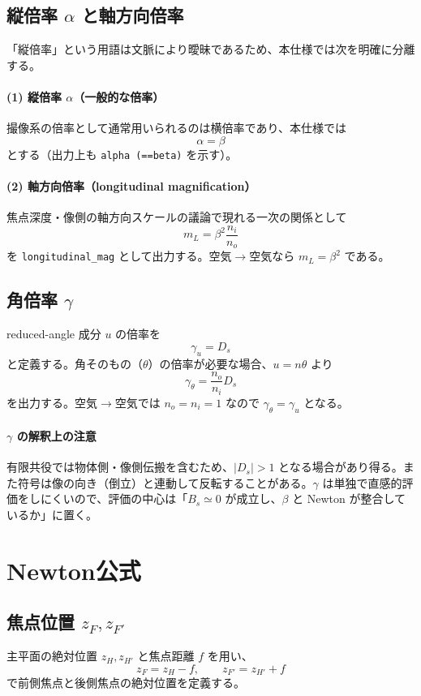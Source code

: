 \subsection{縦倍率 $\alpha$ と軸方向倍率}
「縦倍率」という用語は文脈により曖昧であるため、本仕様では次を明確に分離する。

\paragraph{(1) 縦倍率 $\alpha$（一般的な倍率）}
撮像系の倍率として通常用いられるのは横倍率であり、本仕様では
\[
\boxed{\alpha = \beta}
\]
とする（出力上も \texttt{alpha (==beta)} を示す）。

\paragraph{(2) 軸方向倍率（longitudinal magnification）}
焦点深度・像側の軸方向スケールの議論で現れる一次の関係として
\[
\boxed{
m_L = \beta^2\frac{n_i}{n_o}
}
\]
を \texttt{longitudinal\_mag} として出力する。空気$\to$空気なら $m_L=\beta^2$ である。

\subsection{角倍率 $\gamma$}
reduced-angle 成分 $u$ の倍率を
\[
\boxed{\gamma_u = D_s}
\]
と定義する。角そのもの（$\theta$）の倍率が必要な場合、$u=n\theta$ より
\[
\boxed{\gamma_\theta = \frac{n_o}{n_i}D_s}
\]
を出力する。空気$\to$空気では $n_o=n_i=1$ なので $\gamma_\theta=\gamma_u$ となる。

\paragraph{$\gamma$ の解釈上の注意}
有限共役では物体側・像側伝搬を含むため、$|D_s|>1$ となる場合があり得る。また符号は像の向き（倒立）と連動して反転することがある。$\gamma$ は単独で直感的評価をしにくいので、評価の中心は「$B_s\simeq 0$ が成立し、$\beta$ と Newton が整合しているか」に置く。

\section{Newton公式}

\subsection{焦点位置 $z_F, z_{F'}$}
主平面の絶対位置 $z_H, z_{H'}$ と焦点距離 $f$ を用い、
\[
\boxed{z_F = z_H - f},
\qquad
\boxed{z_{F'} = z_{H'} + f}
\]
で前側焦点と後側焦点の絶対位置を定義する。

